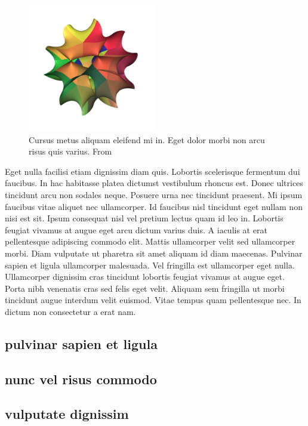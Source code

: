 \documentclass[10pt, a4paper]{article}
\numberwithin{equation}{section}
\begin{document}
\begin{figure}[ht]
  \centering
  \includegraphics[width=0.5\textwidth]{CalabiYau5.jpg}
  \caption{Cursus metus aliquam eleifend mi in. Eget dolor morbi non arcu risus quis varius. From \cite{wiki:xxx}}
  \label{fig:calabi-yau}
\end{figure}

Eget nulla facilisi etiam dignissim diam quis. Lobortis scelerisque fermentum dui faucibus. In hac habitasse platea dictumst vestibulum rhoncus est. Donec ultrices tincidunt arcu non sodales neque. Posuere urna nec tincidunt praesent. Mi ipsum faucibus vitae aliquet nec ullamcorper. Id faucibus nisl tincidunt eget nullam non nisi est sit. Ipsum consequat nisl vel pretium lectus quam id leo in. Lobortis feugiat vivamus at augue eget arcu dictum varius duis. A iaculis at erat pellentesque adipiscing commodo elit. Mattis ullamcorper velit sed ullamcorper morbi. Diam vulputate ut pharetra sit amet aliquam id diam maecenas. Pulvinar sapien et ligula ullamcorper malesuada. Vel fringilla est ullamcorper eget nulla. Ullamcorper dignissim cras tincidunt lobortis feugiat vivamus at augue eget. Porta nibh venenatis cras sed felis eget velit. Aliquam sem fringilla ut morbi tincidunt augue interdum velit euismod. Vitae tempus quam pellentesque nec. In dictum non consectetur a erat nam.

\subsection{pulvinar sapien et ligula}
\subsection{nunc vel risus commodo}
\subsection{vulputate dignissim}
\end{document}
